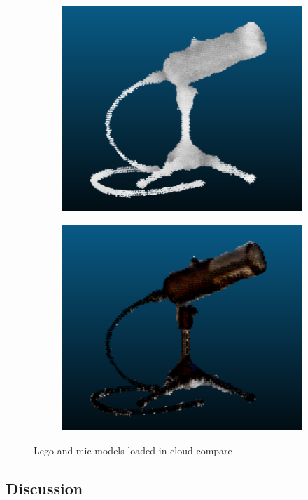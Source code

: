 \documentclass{article}
\begin{document}
\begin{figure}[!h]
\begin{subfigure}{.21\textwidth}
  \includegraphics[width=\linewidth]{figs/mic_pc_no.png}  
\end{subfigure}
\begin{subfigure}{.21\textwidth}
  \centering
  \includegraphics[width=\linewidth]{figs/mic_pc.png}  
\end{subfigure}
     \caption{Lego and mic models loaded in cloud compare}
    \label{fig:cc}
\end{figure}

 
\subsection{Discussion}
\end{document}
